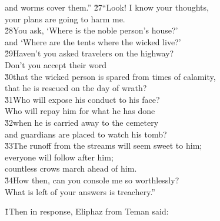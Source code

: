 \begin{poetry}
\poemll    and worms cover them.''
\poeml \v{27}``Look! I know your thoughts, \\
\poemll    your plans are going to harm me. \\
\poeml \v{28}You ask, `Where is the noble person's house?' \\
\poemll    and `Where are the tents where the wicked live?' \\
\poeml \v{29}Haven't you asked travelers on the highway? \\
\poemll    Don't you accept their word \\
\poeml \v{30}that the wicked person is spared from times of calamity, \\
\poemll    that he is rescued on the day of wrath? \\
\poeml \v{31}Who will expose his conduct to his face? \\
\poemll    Who will repay him for what he has done \\
\poeml \v{32}when he is carried away to the cemetery \\
\poemll    and guardians are placed to watch his tomb? \\
\poeml \v{33}The runoff from the streams will seem sweet to him; \\
\poemll    everyone will follow after him; \\
\poemlll       countless crows march ahead of him. \\
\poeml \v{34}How then, can you console me so worthlessly? \\
\poemll    What is left of your answers is treachery.''
\end{poetry}

\v{1}Then in response, Eliphaz from Teman said:

